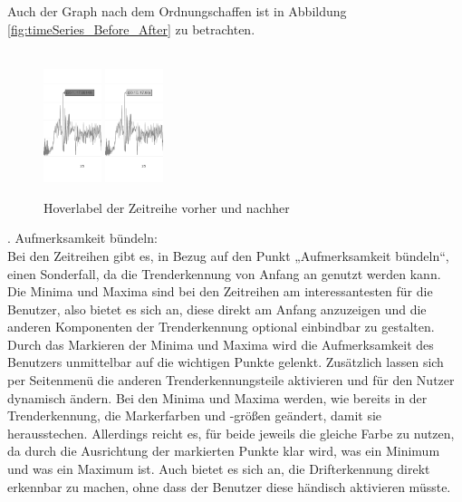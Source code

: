 Auch der Graph nach dem Ordnungschaffen ist in Abbildung \ref{fig:timeSeries_Before_After} zu betrachten.\\\\
\begin{figure}[h!]
\centering
\includegraphics[width=0.15\textwidth]{gfx/Zeitreihe_label_before.png} 
\hspace*{+2cm}\includegraphics[width=0.15\textwidth]{gfx/Zeitreihe_label_after.png}
\caption{Hoverlabel der Zeitreihe vorher und nachher}
\label{fig:timeSeries_label_Before_After}
\end{figure}
. Aufmerksamkeit bündeln:\\
Bei den Zeitreihen gibt es, in Bezug auf den Punkt „Aufmerksamkeit bündeln“, einen Sonderfall, da die Trenderkennung von Anfang an genutzt werden kann. Die Minima und Maxima sind bei den Zeitreihen am interessantesten für die Benutzer, also bietet es sich an, diese direkt am Anfang anzuzeigen und die anderen Komponenten der Trenderkennung optional einbindbar zu gestalten. Durch das Markieren der Minima und Maxima wird die Aufmerksamkeit des Benutzers unmittelbar auf die wichtigen Punkte gelenkt. Zusätzlich lassen sich per Seitenmenü die anderen Trenderkennungsteile aktivieren und für den Nutzer dynamisch ändern. Bei den Minima und Maxima werden, wie bereits in der Trenderkennung, die Markerfarben und -größen geändert, damit sie herausstechen. Allerdings reicht es, für beide jeweils die gleiche Farbe zu nutzen, da durch die Ausrichtung der markierten Punkte klar wird, was ein Minimum und was ein Maximum ist. Auch bietet es sich an, die Drifterkennung direkt erkennbar zu machen, ohne dass der Benutzer diese händisch aktivieren müsste. \\\\
